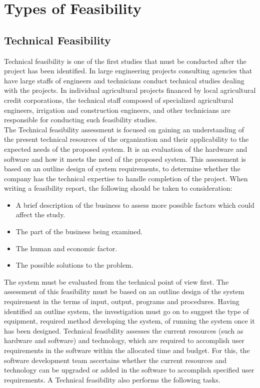 \section{Types of Feasibility}

\subsection{Technical Feasibility}
Technical feasibility is one of the first studies that must be conducted after the project has been identified. In large engineering projects consulting agencies that have large staffs of engineers and technicians conduct technical studies dealing with the projects. In individual agricultural projects financed by local agricultural credit corporations, the technical staff composed of specialized agricultural engineers, irrigation and construction engineers, and other technicians are responsible for conducting such feasibility studies. \\
The Technical feasibility assessment is focused on gaining an understanding of the present technical resources of the organization and their applicability to the expected needs of the proposed system. It is an evaluation of the hardware and software and how it meets the need of the proposed system. This assessment is based on an outline design of system requirements, to determine whether the company has the technical expertise to handle completion of the project. When writing a feasibility report, the following should be taken to consideration:
\begin{itemize}
	\item A brief description of the business to assess more possible factors which could affect the study.
	\item The part of the business being examined.
	\item The human and economic factor.
	\item The possible solutions to the problem.
\end{itemize}

The system must be evaluated from the technical point of view first. The assessment of this feasibility must be based on an outline design of the system requirement in the terms of input, output, programs and procedures. Having identified an outline system, the investigation must go on to suggest the type of equipment, required method developing the system, of running the system once it has been designed. Technical feasibility assesses the current resources (such as hardware and software) and technology, which are required to accomplish user requirements in the software within the allocated time and budget. For this, the software development team ascertains whether the current resources and technology can be upgraded or added in the software to accomplish specified user requirements. A Technical feasibility also performs the following tasks.


